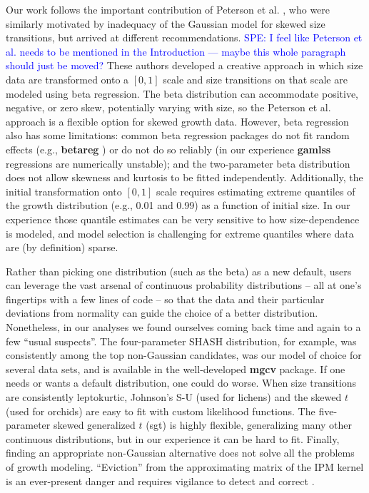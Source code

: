\documentclass[12pt]{article}
\begin{document}
Our work follows the important contribution of Peterson et al. \citeyear{peterson2019improving}, who were similarly motivated by inadequacy of the Gaussian model for skewed size transitions, but arrived at different recommendations. \textcolor{blue}{SPE: I feel like Peterson et al. needs
to be mentioned in the Introduction --- maybe this whole paragraph should just be moved?} 
These authors developed a creative approach in which size data are transformed onto a $[0,1]$ scale and size transitions on that scale are modeled using beta regression. 
The beta distribution can accommodate positive, negative, or zero skew, potentially varying with size, so the Peterson et al. approach is a 
flexible option for skewed growth data. 
However, beta regression also has some limitations: common beta regression packages do not fit random effects (e.g., \textbf{betareg} \citep{cribari2010beta}) or do not do so reliably (in our experience \textbf{gamlss} regressions are numerically unstable); and the two-parameter beta distribution does not allow skewness and kurtosis to be fitted independently. Additionally, the initial transformation onto $[0,1]$ scale requires estimating extreme quantiles of the growth distribution (e.g., 0.01 and 0.99) as a function of initial size. In our experience those quantile estimates can be very sensitive to how size-dependence is modeled, and model selection is challenging for extreme quantiles where data are (by definition) sparse. 

Rather than picking one distribution (such as the beta) as a new default, users can leverage the vast arsenal of continuous probability distributions -- all at one's fingertips with a few lines of code -- so that the data and their particular deviations from normality can guide the choice of a better distribution. 
Nonetheless, in our analyses we found ourselves coming back time and again to a few ``usual suspects''. 
The four-parameter SHASH distribution, for example, was consistently among the top non-Gaussian candidates, was our model of choice for several data sets, and is available in the well-developed \textbf{mgcv} package. 
If one needs or wants a default distribution, one could do worse. 
When size transitions are consistently leptokurtic, Johnson's S-U (used for lichens) and the skewed $t$ (used for orchids) are easy to fit with custom likelihood functions. 
The five-parameter skewed generalized $t$ (sgt) is highly flexible, generalizing many other continuous distributions, but in our experience it can be hard to fit. 
Finally, finding an appropriate non-Gaussian alternative does not solve all the problems of growth modeling. 
``Eviction'' from the approximating matrix of the IPM kernel is an ever-present danger and requires vigilance to detect and correct \citep{williams2012avoiding}. 
\end{document}
